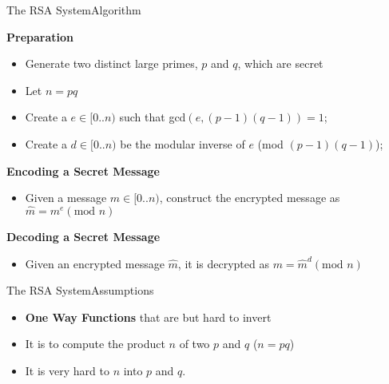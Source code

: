 \begin{frame}{The RSA System}{Algorithm}

  {\bf Preparation}
  \begin{itemize}
    \item Generate two distinct large primes, $p$ and $q$, which are secret
    \item Let $n = pq$
    \item Create a  $e \in [0..n)$ such that gcd$(e, (p-1)(q-1)) = 1$;
    \item Create a  $d \in [0..n)$ be the modular inverse of $e$ (mod $(p-1)(q-1)$);
  \end{itemize}\bigskip

  {\bf Encoding a Secret Message}
  \begin{itemize}
    \item Given a message $m \in [0..n)$, construct the encrypted message as $\hat{m} = m^e (\text{mod }n)$
  \end{itemize}\bigskip

  {\bf Decoding a Secret Message}
  \begin{itemize}
    \item Given an encrypted message $\hat{m}$, it is decrypted as $m = \hat{m}^d (\text{mod }n)$
  \end{itemize}\bigskip
\end{frame}

\begin{frame}{The RSA System}{Assumptions}

  \begin{itemize}
  \item {} {\bf One Way Functions}
    that are  but \alert{hard to invert}

    \bigskip

  \item It is  to compute the product $n$ of
    two  $p$ and $q$ ($n = pq$)

    \bigskip

  \item It is \alert{very hard} to  $n$
    into $p$ and $q$.

  \end{itemize}
\end{frame}
